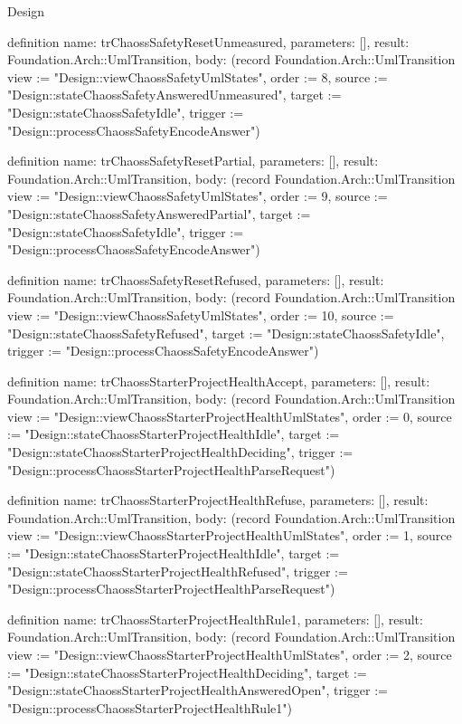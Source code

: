 \begin{lexlean}{Design}
\begin{semanticmodule}
definition{
  name: trChaossSafetyResetUnmeasured,
  parameters: [],
  result: Foundation.Arch::UmlTransition,
  body: (record Foundation.Arch::UmlTransition {view := "Design::viewChaossSafetyUmlStates", order := 8, source := "Design::stateChaossSafetyAnsweredUnmeasured", target := "Design::stateChaossSafetyIdle", trigger := "Design::processChaossSafetyEncodeAnswer"})
}

definition{
  name: trChaossSafetyResetPartial,
  parameters: [],
  result: Foundation.Arch::UmlTransition,
  body: (record Foundation.Arch::UmlTransition {view := "Design::viewChaossSafetyUmlStates", order := 9, source := "Design::stateChaossSafetyAnsweredPartial", target := "Design::stateChaossSafetyIdle", trigger := "Design::processChaossSafetyEncodeAnswer"})
}

definition{
  name: trChaossSafetyResetRefused,
  parameters: [],
  result: Foundation.Arch::UmlTransition,
  body: (record Foundation.Arch::UmlTransition {view := "Design::viewChaossSafetyUmlStates", order := 10, source := "Design::stateChaossSafetyRefused", target := "Design::stateChaossSafetyIdle", trigger := "Design::processChaossSafetyEncodeAnswer"})
}

definition{
  name: trChaossStarterProjectHealthAccept,
  parameters: [],
  result: Foundation.Arch::UmlTransition,
  body: (record Foundation.Arch::UmlTransition {view := "Design::viewChaossStarterProjectHealthUmlStates", order := 0, source := "Design::stateChaossStarterProjectHealthIdle", target := "Design::stateChaossStarterProjectHealthDeciding", trigger := "Design::processChaossStarterProjectHealthParseRequest"})
}

definition{
  name: trChaossStarterProjectHealthRefuse,
  parameters: [],
  result: Foundation.Arch::UmlTransition,
  body: (record Foundation.Arch::UmlTransition {view := "Design::viewChaossStarterProjectHealthUmlStates", order := 1, source := "Design::stateChaossStarterProjectHealthIdle", target := "Design::stateChaossStarterProjectHealthRefused", trigger := "Design::processChaossStarterProjectHealthParseRequest"})
}

definition{
  name: trChaossStarterProjectHealthRule1,
  parameters: [],
  result: Foundation.Arch::UmlTransition,
  body: (record Foundation.Arch::UmlTransition {view := "Design::viewChaossStarterProjectHealthUmlStates", order := 2, source := "Design::stateChaossStarterProjectHealthDeciding", target := "Design::stateChaossStarterProjectHealthAnsweredOpen", trigger := "Design::processChaossStarterProjectHealthRule1"})
}


\end{semanticmodule}
\end{lexlean}

